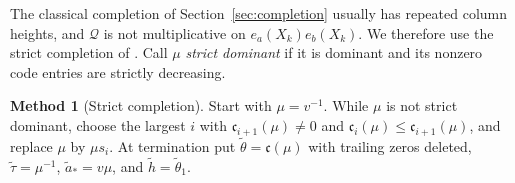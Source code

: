 \documentclass{amsart}
\theoremstyle{definition}
\newtheorem{method}[theorem]{Method}
\theoremstyle{remark}
\numberwithin{equation}{section}
\newcommand{\code}{\mathfrak c}
\begin{document}
The classical completion of Section~\ref{sec:completion} usually has
repeated column heights, and $\mathcal Q$ is not multiplicative on
$e_a(X_k)e_b(X_k)$.
We therefore use the strict completion of
\cite[Definition~4.1]{samuelquantum}.
Call $\mu$ \emph{strict dominant} if it is dominant and its nonzero
code entries are strictly decreasing.

\begin{method}[Strict completion]\label{method:strict}
Start with $\mu=v^{-1}$.
While $\mu$ is not strict dominant, choose the largest $i$ with
$\code_{i+1}(\mu)\neq0$ and $\code_i(\mu)\leq\code_{i+1}(\mu)$,
and replace $\mu$ by $\mu s_i$.
At termination put $\tilde\theta=\code(\mu)$ with trailing zeros
deleted, $\tilde\tau=\mu^{-1}$, $\tilde a_*=v\mu$, and
$\tilde h=\tilde\theta_1$.
\end{method}
\end{document}
